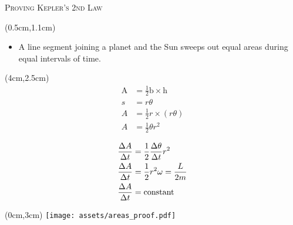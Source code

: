 \documentclass[9pt]{beamer}
\begin{document}
    \begin{frame}{\textsc{Proving Kepler's 2nd Law}}
        \centering
        \begin{textblock*}{10.5cm}(0.5cm,1.1cm)
            \begin{itemize}
                \item A line segment joining a planet and the Sun sweeps out equal areas during equal intervals of time.
            \end{itemize}
        \end{textblock*}

        \begin{textblock*}{10.5cm}(4cm,2.5cm)
            \centering
            \begin{align*}
                \text{A} &= \frac{1}{2}\text{b}\times\text{h} \\        
                s &= r\theta \\
                A&=\frac{1}{2}r\times\left(r\theta\right) \\          
                A&=\frac12 \theta r^2 \\
            \end{align*}
            \begin{align*}
                \frac{\Delta A}{\Delta t} &= \frac{1}{2}\frac{\Delta \theta}{\Delta t}r^2 \\
                \frac{\Delta A}{\Delta t} &= \frac{1}{2}r^2 \omega =\frac{L}{2m}  \\          
                \frac{\Delta A}{\Delta t} &= \rm{constant}
            \end{align*} 
        \end{textblock*}
        
        \begin{textblock*}{8cm}(0cm,3cm)
            \centering
            \texttt{[image: assets/areas\_proof.pdf]}
        \end{textblock*}
    \end{frame}
    
\end{document}
